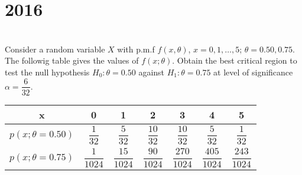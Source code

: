 \section*{2016}
\vspace{-.5cm}
\hrulefill \smallskip\\
 Consider a random variable $X$ with p.m.f $f(x,\theta)$, $x = 0,1,\ldots,5$; $\theta = 0.50, 0.75$. The followig table gives the values of $f(x;\theta)$. Obtain the best critical region to test the null hypothesis $H_0 : \theta = 0.50$ against $H_1: \theta = 0.75$ at level of significance $\alpha = \dfrac{6}{32}$.
\begin{center}
    \begin{tabular}{|*{7}{c|}}
        \hline
        x & 0 & 1 & 2 & 3 & 4 & 5  \\\hline 
        $p(x; \theta = 0.50)$ & $\dfrac{1}{32}$ & $\dfrac{5}{32}$ & $\dfrac{10}{32}$ & $\dfrac{10}{32}$ & $\dfrac{5}{32}$ & $\dfrac{1}{32}$  \\[2ex]\hline 
        $p(x; \theta = 0.75)$ & $\dfrac{1}{1024}$ & $\dfrac{15}{1024}$ & $\dfrac{90}{1024}$ & $\dfrac{270}{1024}$ & $\dfrac{405}{1024}$ & $\dfrac{243}{1024}$  \\[2ex]\hline 
    \end{tabular}
\end{center}